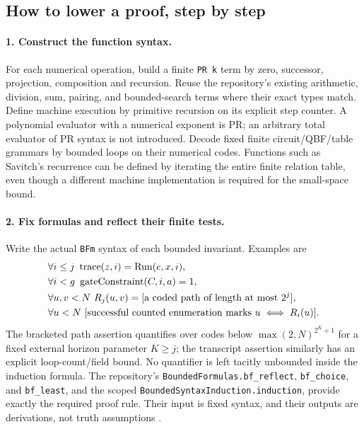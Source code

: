 \subsection{How to lower a proof, step by step}
\paragraph{1. Construct the function syntax.}
For each numerical operation, build a finite \texttt{PR k} term by zero, successor, projection, composition and recursion. Reuse the repository's existing arithmetic, division, sum, pairing, and bounded-search terms where their exact types match. Define machine execution by primitive recursion on its explicit step counter. A polynomial evaluator with a numerical exponent is PR; an arbitrary total evaluator of PR syntax is not introduced. Decode fixed finite circuit/QBF/table grammars by bounded loops on their numerical codes. Functions such as Savitch's recurrence can be defined by iterating the entire finite relation table, even though a different machine implementation is required for the small-space bound.

\paragraph{2. Fix formulas and reflect their finite tests.}
Write the actual \texttt{BFm} syntax of each bounded invariant. Examples are
\begin{align*}
 &\forall i\le j\ \operatorname{trace}(z,i)=\operatorname{Run}(e,x,i),\\
 &\forall i<g\ \operatorname{gateConstraint}(C,i,a)=1,\\
 &\forall u,v<N\ R_j(u,v)=[\text{a coded path of length at most }2^j],\\
 &\forall u<N\ [\text{successful counted enumeration marks }u\iff R_i(u)].
\end{align*}
The bracketed path assertion quantifies over codes below $\max(2,N)^{2^K+1}$ for a fixed external horizon parameter $K\ge j$; the transcript assertion similarly has an explicit loop-count/field bound. No quantifier is left tacitly unbounded inside the induction formula. The repository's \texttt{BoundedFormulas.bf\_reflect}, \texttt{bf\_choice}, and \texttt{bf\_least}, and the scoped \texttt{BoundedSyntaxInduction.induction}, provide exactly the required proof rule. Their input is fixed syntax, and their outputs are derivations, not truth assumptions \cite{ProveItBounded}.

